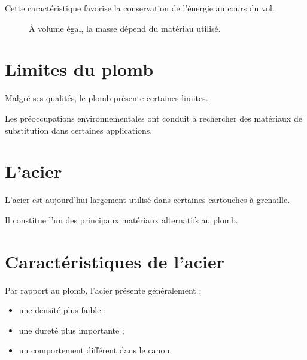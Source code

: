 Cette caractéristique favorise la conservation de l'énergie au cours du vol.

\begin{figure}[htbp]
\centering


\caption{À volume égal, la masse dépend du matériau utilisé.}
\label{fig:volume_constant_materiaux}

\end{figure}

\section{Limites du plomb}

Malgré ses qualités, le plomb présente certaines limites.

Les préoccupations environnementales ont conduit à rechercher des matériaux de
substitution dans certaines applications.

\section{L'acier}

L'acier est aujourd'hui largement utilisé dans certaines cartouches à
grenaille.

Il constitue l'un des principaux matériaux alternatifs au plomb.

\section{Caractéristiques de l'acier}

Par rapport au plomb, l'acier présente généralement :

\begin{itemize}
    \item une densité plus faible ;
    \item une dureté plus importante ;
    \item un comportement différent dans le canon.
\end{itemize}

